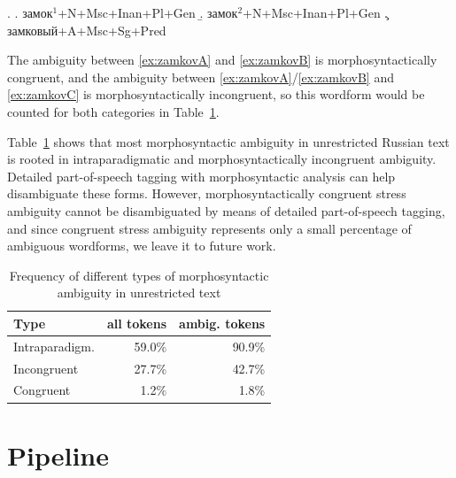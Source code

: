 \documentclass[11pt]{article}
\newcommand{\rus}[1]{\foreignlanguage{russian}{#1}}
\begin{document}
\ex. \label{ex:zamkov}
	 \a. \rus{замок}$^1$+N+Msc+Inan+Pl+Gen \label{ex:zamkovA}
	 \b. \rus{замок}$^2$+N+Msc+Inan+Pl+Gen \label{ex:zamkovB}
	 \c. \rus{замковый}+A+Msc+Sg+Pred      \label{ex:zamkovC}

The ambiguity between \ref{ex:zamkovA} and \ref{ex:zamkovB} is morphosyntactically congruent, and
the ambiguity between \ref{ex:zamkovA}/\ref{ex:zamkovB} and \ref{ex:zamkovC} is
morphosyntactically incongruent, so this wordform would be counted for both categories in
Table~\ref{table:ambiguity}.

Table~\ref{table:ambiguity} shows that most morphosyntactic ambiguity in 
unrestricted Russian text is rooted in intraparadigmatic and morphosyntactically 
incongruent ambiguity. Detailed part-of-speech tagging with morphosyntactic 
analysis can help disambiguate these forms. However, morphosyntactically congruent stress 
ambiguity cannot be disambiguated by means of detailed part-of-speech tagging, 
and since congruent stress ambiguity represents only a small percentage of 
ambiguous wordforms, we leave it to future work.

\begin{table}[ht]
  \centering
  \begin{tabular}{l|rr}
    \hline
    \textbf{Type}  & \textbf{all tokens} & \textbf{ambig. tokens} \\
    \hline
    Intraparadigm. & 59.0\%                   & 90.9\%   \\
    Incongruent    & 27.7\%                   & 42.7\%   \\ 
    Congruent      & 1.2\%                   & 1.8\%    \\ 
    \hline
  \end{tabular}
  \caption{Frequency of different types of morphosyntactic ambiguity in unrestricted text}
  \label{table:ambiguity}
\end{table}



\section{Pipeline}
\label{sec:pipeline}
\end{document}
